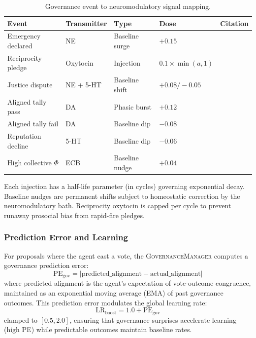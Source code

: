 \documentclass[11pt,a4paper]{article}
\begin{document}
\begin{table}[h]
\centering
\caption{Governance event to neuromodulatory signal mapping.}
\label{tab:neuromod}
\begin{tabular}{p{3.2cm}p{2.8cm}p{2.2cm}p{1.5cm}p{2.5cm}}
\toprule
\textbf{Event} & \textbf{Transmitter} & \textbf{Type} & \textbf{Dose} & \textbf{Citation} \\
\midrule
Emergency declared & NE & Baseline surge & $+0.15$ & \citet{arnsten2009stress} \\
Reciprocity pledge & Oxytocin & Injection & $0.1 \times \min(a, 1)$ & \citet{zak2012moral} \\
Justice dispute & NE + 5-HT & Baseline shift & $+0.08 / -0.05$ & \citet{sapolsky2004why} \\
Aligned tally pass & DA & Phasic burst & $+0.12$ & \citet{schultz1997neural} \\
Aligned tally fail & DA & Baseline dip & $-0.08$ & \citet{schultz1997neural} \\
Reputation decline & 5-HT & Baseline dip & $-0.06$ & \citet{crockett2009serotonin} \\
High collective $\Phi$ & ECB & Baseline nudge & $+0.04$ & \citet{trezza2010endocannabinoid} \\
\bottomrule
\end{tabular}
\end{table}

Each injection has a half-life parameter (in cycles) governing exponential decay.
Baseline nudges are permanent shifts subject to homeostatic correction by the neuromodulatory bath.
Reciprocity oxytocin is capped per cycle to prevent runaway prosocial bias from rapid-fire pledges.

\subsubsection{Prediction Error and Learning}

For proposals where the agent cast a vote, the \textsc{GovernanceManager} computes a governance prediction error:
\[
\text{PE}_{\text{gov}} = |\text{predicted\_alignment} - \text{actual\_alignment}|
\]
where predicted alignment is the agent's expectation of vote-outcome congruence, maintained as an exponential moving average (EMA) of past governance outcomes.
This prediction error modulates the global learning rate:
\[
\text{LR}_{\text{boost}} = 1.0 + \text{PE}_{\text{gov}}
\]
clamped to $[0.5, 2.0]$, ensuring that governance surprises accelerate learning (high PE) while predictable outcomes maintain baseline rates.
\end{document}
